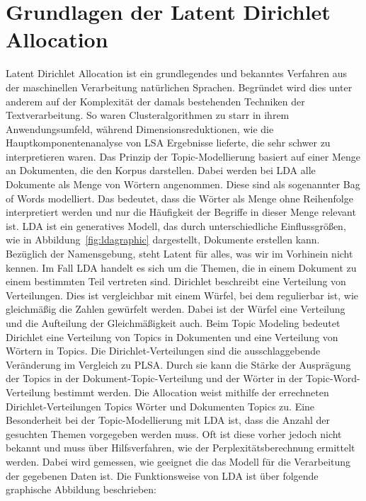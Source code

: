 \documentclass[german,version-2020-11]{uzl-thesis}
\begin{document}
\section{Grundlagen der Latent Dirichlet Allocation }
Latent Dirichlet Allocation ist ein grundlegendes und bekanntes Verfahren aus der maschinellen Verarbeitung natürlichen Sprachen. Begründet wird dies unter anderem auf der Komplexität der damals bestehenden Techniken der Textverarbeitung. So waren Clusteralgorithmen zu starr in ihrem Anwendungsumfeld, während Dimensionsreduktionen, wie die Hauptkomponentenanalyse von LSA Ergebnisse lieferte, die sehr schwer zu interpretieren waren. Das Prinzip der Topic-Modellierung basiert auf einer Menge an Dokumenten, die den Korpus darstellen. Dabei werden bei LDA alle Dokumente als Menge von Wörtern angenommen. Diese sind als sogenannter Bag of Words modelliert. Das bedeutet, dass die Wörter als Menge ohne Reihenfolge interpretiert werden und nur die Häufigkeit der Begriffe in dieser Menge relevant ist. LDA ist ein generatives Modell, das durch unterschiedliche Einflussgrößen, wie in Abbildung \ref{fig:ldagraphic} dargestellt, Dokumente erstellen kann. \\

Bezüglich der Namensgebung, steht Latent für alles, was wir im Vorhinein nicht kennen. Im Fall LDA handelt es sich um die Themen, die in einem Dokument zu einem bestimmten Teil vertreten sind. Dirichlet beschreibt eine Verteilung von Verteilungen. Dies ist vergleichbar mit einem Würfel, bei dem regulierbar ist, wie gleichmäßig die Zahlen gewürfelt werden. Dabei ist der Würfel eine Verteilung und die Aufteilung der Gleichmäßigkeit auch. Beim Topic Modeling bedeutet Dirichlet eine Verteilung von Topics in Dokumenten und eine Verteilung von Wörtern in Topics. Die Dirichlet-Verteilungen sind die ausschlaggebende Veränderung im Vergleich zu PLSA. Durch sie kann die Stärke der Ausprägung der Topics in der Dokument-Topic-Verteilung und der Wörter in der Topic-Word-Verteilung bestimmt werden. Die Allocation weist mithilfe der errechneten Dirichlet-Verteilungen Topics Wörter und Dokumenten Topics zu. Eine Besonderheit bei der Topic-Modellierung mit LDA ist, dass die Anzahl der gesuchten Themen  vorgegeben werden muss. Oft ist diese vorher jedoch nicht bekannt und muss über Hilfsverfahren, wie der Perplexitätsberechnung ermittelt werden. Dabei wird gemessen, wie geeignet die das Modell für die Verarbeitung der gegebenen Daten ist. Die Funktionsweise von LDA ist über folgende graphische Abbildung beschrieben: \\
\end{document}
